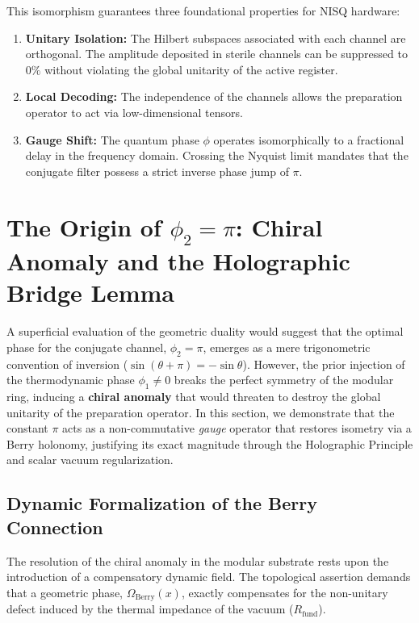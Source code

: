 \documentclass[reprint,aps,pra,superscriptaddress,nofootinbib]{revtex4-2}
\theoremstyle{plain}
\theoremstyle{definition}
\theoremstyle{remark}
\begin{document}
This isomorphism guarantees three foundational properties for NISQ hardware:
\begin{enumerate}
    \item \textbf{Unitary Isolation:} The Hilbert subspaces associated with each channel are orthogonal. The amplitude deposited in sterile channels can be suppressed to $0\%$ without violating the global unitarity of the active register.
    \item \textbf{Local Decoding:} The independence of the channels allows the preparation operator to act via low-dimensional tensors.
    \item \textbf{Gauge Shift:} The quantum phase $\phi$ operates isomorphically to a fractional delay in the frequency domain. Crossing the Nyquist limit mandates that the conjugate filter possess a strict inverse phase jump of $\pi$.
\end{enumerate}

\section{The Origin of $\phi_2 = \pi$: Chiral Anomaly and the Holographic Bridge Lemma}
\label{sec:origen_pi}

A superficial evaluation of the geometric duality would suggest that the optimal phase for the conjugate channel, $\phi_2 = \pi$, emerges as a mere trigonometric convention of inversion ($\sin(\theta+\pi) = -\sin\theta$). However, the prior injection of the thermodynamic phase $\phi_1 \neq 0$ breaks the perfect symmetry of the modular ring, inducing a \textbf{chiral anomaly} that would threaten to destroy the global unitarity of the preparation operator. In this section, we demonstrate that the constant $\pi$ acts as a non-commutative \textit{gauge} operator that restores isometry via a Berry holonomy, justifying its exact magnitude through the Holographic Principle and scalar vacuum regularization.

\subsection{Dynamic Formalization of the Berry Connection}
\label{subsec:berry_formalism}

The resolution of the chiral anomaly in the modular substrate rests upon the introduction of a compensatory dynamic field. The topological assertion demands that a geometric phase, $\Omega_{\text{Berry}}(x)$, exactly compensates for the non-unitary defect induced by the thermal impedance of the vacuum ($R_{\text{fund}}$).
\end{document}
